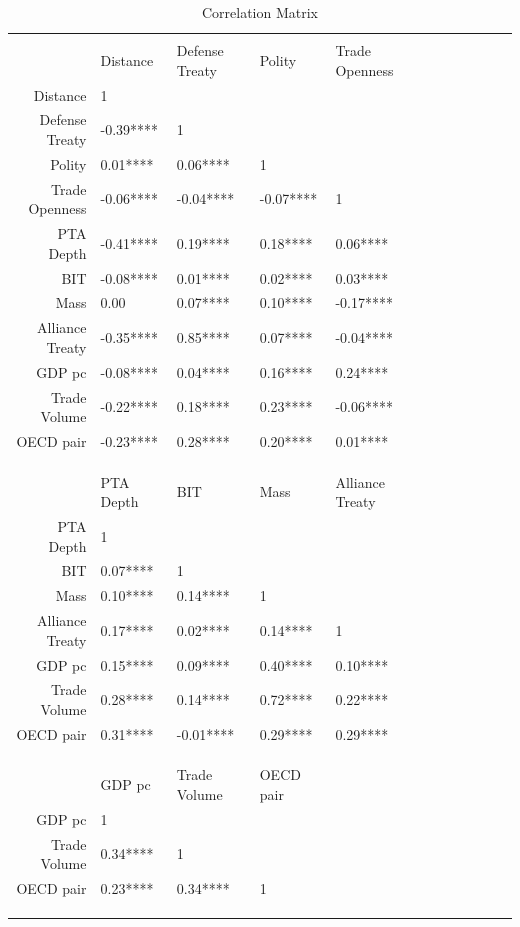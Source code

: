 \documentclass[reqno,onecolumn,letterpaper,12pt]{article}
\begin{document}
\begin{table}[ht]
\caption{Correlation Matrix}
\label{cor_mat}
\centering
\begin{tabular}{rlllllllllll}
\\[-1.8ex]\hline
\hline \\[-1.8ex]
 & Distance & Defense Treaty & Polity & Trade Openness  \\
  \hline
  Distance & 1 &  &  &  \\
  Defense Treaty & -0.39**** & 1  &  &   \\
  Polity &  0.01**** &  0.06**** & 1 &   \\
  Trade Openness & -0.06**** & -0.04**** & -0.07**** & 1   \\
  PTA Depth & -0.41**** &  0.19**** &  0.18**** &  0.06****   \\
  BIT  & -0.08**** &  0.01**** &  0.02**** &  0.03****   \\
  Mass &  0.00     &  0.07**** &  0.10**** & -0.17****   \\
  Alliance Treaty & -0.35**** &  0.85**** &  0.07**** & -0.04****  \\
 GDP pc & -0.08**** &  0.04**** &  0.16**** &  0.24****   \\
  Trade Volume & -0.22**** &  0.18**** &  0.23**** & -0.06****  \\
  OECD pair & -0.23**** &  0.28**** &  0.20**** &  0.01**** \\
\hline \\[-1.8ex]
\\[-1.8ex]\hline
\hline \\[-1.8ex]

 &  PTA Depth & BIT & Mass & Alliance  Treaty  \\
  \hline
  PTA Depth &  1 &  &  &    \\
  BIT  & 0.07**** &1  &  &    \\
  Mass &   0.10**** &  0.14**** &1  &    \\
  Alliance Treaty  &  0.17**** &  0.02**** &  0.14**** & 1  \\
 GDP pc &  0.15**** &  0.09**** &  0.40**** &  0.10****  \\
  Trade Volume  &  0.28**** &  0.14**** &  0.72**** &  0.22****   \\
  OECD pair  &  0.31**** & -0.01**** &  0.29**** &  0.29****  \\
\hline \\[-1.8ex]
\\[-1.8ex]\hline
\hline \\[-1.8ex]

 & GDP pc & Trade Volume & OECD pair \\
  \hline
 GDP pc & 1 &  &\\
  Trade Volume &  0.34**** & 1 &\\
  OECD pair  &  0.23**** &  0.34****&1 \\
\hline \\[-1.8ex]
\\[-1.8ex]\hline
\hline \\[-1.8ex]

\end{tabular}
\end{table}
\end{document}
